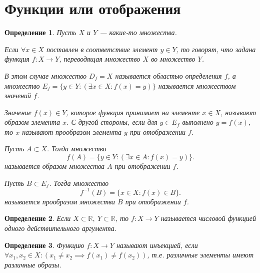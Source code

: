 \documentclass[a4paper,12pt]{article} %
\newtheorem{definition}{Определение}[section]
\theoremstyle{remark}
\theoremstyle{definition}
\begin{document}
\section{Функции или отображения}
\begin{definition}
    
Пусть $X$ и $Y$ --- какие-то множества.

Если $\forall x\in X$ поставлен в соответствие элемент $y\in Y$, то говорят, что задана функция $f : X \to Y$,
переводящая множество $X$ во множество $Y$.

В этом случае множество $D_f = X$ называется областью определения $f$,
а множество $E_f = \{y\in Y : (\exists x \in X : f(x) = y)\} $ называется множеством значений $f$.

Значение $f(x) \in Y$, которое функция принимает на элементе $x\in X$, называют образом элемента $x$. С другой стороны,
если для $y\in E_f$ выполнено $y=f(x)$, то $x$ называют прообразом элемента $y$ при отображении $f$.

    Пусть $A \subset X$. Тогда множество
    \[f(A) = \{y\in Y : (\exists x\in A : f(x) = y)\} .\] 
    называется образом множества $A$ при отображении $f$.

    Пусть $B \subset E_f$. Тогда множество
    \[f^{-1}(B) = \{x \in X : f(x) \in B\} .\] 
    называется прообразом множества $B$ при отображении $f$.
\end{definition}

\begin{definition}
    Если $X\subset \mathbb{R}, \ Y \subset \mathbb{R}$, то $f : X \to Y$ называется числовой функцией одного
    действительного аргумента.
\end{definition}

\begin{definition}
    Функцию $f : X \to Y$ называют инъекцией, если $\forall x_1, x_2 \in X : (x_1\neq x_2
    \implies f(x_1)\neq f(x_2))$, т.е. различные элементы имеют различные образы.
\end{definition}
\end{document}
